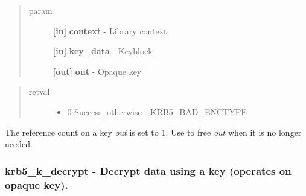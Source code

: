 \documentclass[letterpaper,10pt,english]{sphinxmanual}
\begin{document}
\begin{fulllineitems}
\label{appdev/refs/api/krb5_k_create_key:c.krb5_k_create_key}
\end{fulllineitems}

\begin{quote}\begin{description}
\item[{param}] \leavevmode
\textbf{{[}in{]}} \textbf{context} - Library context

\textbf{{[}in{]}} \textbf{key\_data} - Keyblock

\textbf{{[}out{]}} \textbf{out} - Opaque key

\end{description}\end{quote}
\begin{quote}\begin{description}
\item[{retval}] \leavevmode\begin{itemize}
\item {} 
0   Success; otherwise - KRB5\_BAD\_ENCTYPE

\end{itemize}

\end{description}\end{quote}

The reference count on a key \emph{out} is set to 1. Use {\hyperref[appdev/refs/api/krb5_k_free_key:c.krb5_k_free_key]{}} to free \emph{out} when it is no longer needed.


\subsubsection{krb5\_k\_decrypt -  Decrypt data using a key (operates on opaque key).}
\label{appdev/refs/api/krb5_k_decrypt:krb5-k-decrypt-decrypt-data-using-a-key-operates-on-opaque-key}\label{appdev/refs/api/krb5_k_decrypt::doc}
\end{document}
